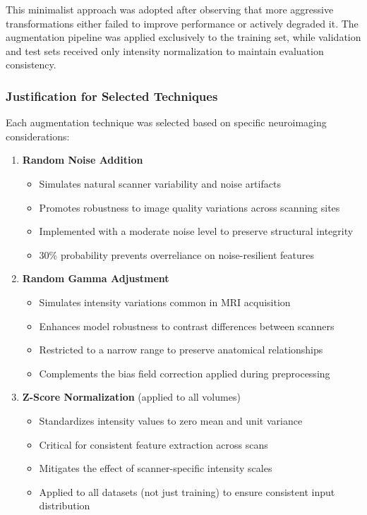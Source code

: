 \documentclass[12pt, a4paper]{article}
\begin{document}
This minimalist approach was adopted after observing that more aggressive transformations either failed to improve performance or actively degraded it. The augmentation pipeline was applied exclusively to the training set, while validation and test sets received only intensity normalization to maintain evaluation consistency.

\subsubsection{Justification for Selected Techniques}

Each augmentation technique was selected based on specific neuroimaging considerations:

\begin{enumerate}
    \item \textbf{Random Noise Addition}
    \begin{itemize}
        \item Simulates natural scanner variability and noise artifacts
        \item Promotes robustness to image quality variations across scanning sites
        \item Implemented with a moderate noise level to preserve structural integrity
        \item 30\% probability prevents overreliance on noise-resilient features
    \end{itemize}

    \item \textbf{Random Gamma Adjustment}
    \begin{itemize}
        \item Simulates intensity variations common in MRI acquisition
        \item Enhances model robustness to contrast differences between scanners
        \item Restricted to a narrow range to preserve anatomical relationships
        \item Complements the bias field correction applied during preprocessing
    \end{itemize}

    \item \textbf{Z-Score Normalization} (applied to all volumes)
    \begin{itemize}
        \item Standardizes intensity values to zero mean and unit variance
        \item Critical for consistent feature extraction across scans
        \item Mitigates the effect of scanner-specific intensity scales
        \item Applied to all datasets (not just training) to ensure consistent input distribution
    \end{itemize}
\end{enumerate}
\end{document}
